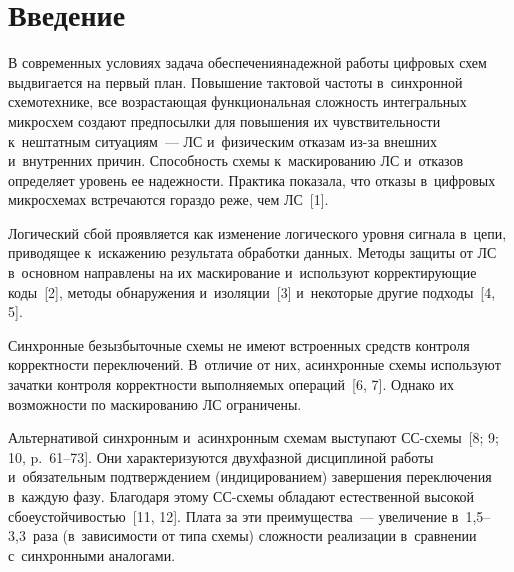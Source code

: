 
  
\vspace*{-3pt}



\thispagestyle{headings}

\begin{multicols}{2}

\label{st\stat}

\section{Введение}

  В современных условиях задача обеспечения\linebreak надежной работы циф\-ро\-вых 
схем выдвигается на первый план. Повышение тактовой частоты 
в~синхронной схемотехнике, все возрастающая функ\-цио\-наль\-ная слож\-ность 
интегральных мик\-ро\-схем создают предпосылки для повышения их 
чув\-ст\-ви\-тель\-ности к~не\-штат\-ным ситуациям~--- ЛС 
и~физическим отказам из-за внеш\-них и~внут\-рен\-них причин. Способ\-ность 
схемы к~маскированию ЛС и~отказов определяет уровень ее на\-деж\-ности. 
Практика показала, что отказы в~циф\-ро\-вых мик\-ро\-схе\-мах встречаются 
гораздо реже, чем ЛС~[1]. 
  
  Логический сбой проявляется как изменение логического уровня сигнала в~цепи, 
приводящее к~искажению результата обработки данных. Методы защиты от 
ЛС в~основном направлены на их маскирование и~используют 
корректирующие коды~[2], методы обнаружения и~изоляции~[3] и~некоторые 
другие подходы~[4, 5]. 
  
  Синхронные безызбыточные схемы не имеют встроенных средств 
контроля корректности переключений. В~отличие от них, асинхронные 
схемы используют зачатки контроля корректности выполняемых 
операций~[6, 7]. Однако их возможности по маскированию ЛС ограничены.
  
  Альтернативой синхронным и~асинхронным схемам выступают 
СС-схе\-мы~[8; 9; 10, p.~61--73]. Они характеризуются двухфазной 
дисциплиной работы и~обязательным под\-тверж\-де\-ни\-ем (индицированием) 
завершения переключения в~каж\-дую фазу. Благодаря этому СС-схе\-мы 
обладают естественной высокой сбоеустойчивостью~[11, 12]. Плата за эти 
преимущества~--- увеличение в~1,5--3,3~раза (в~зависимости от типа схемы) 
сложности реализации в~сравнении с~синхронными аналогами.
  

\end{multicols}
